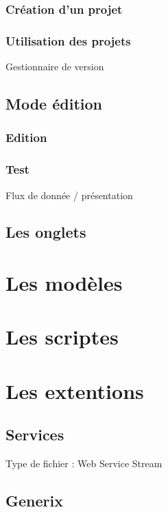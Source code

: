 \documentclass[a4paper,10pt,twoside]{book}
\begin{document}
\subsection{Création d'un projet}

\subsection{Utilisation des projets}
\label{sec:RCS}
Gestionnaire de version

\section{Mode édition}

\subsection{Edition}

\subsection{Test}

Flux de donnée / présentation

\section{Les onglets}

\chapter{Les modèles}

\chapter{Les scriptes}
\label{sec:Scripts}

\chapter{Les extentions}

\section{Services}
\label{sec:Services}


Type de fichier : Web Service Stream


\section{Generix}
\label{sec:Generix}
\end{document}
